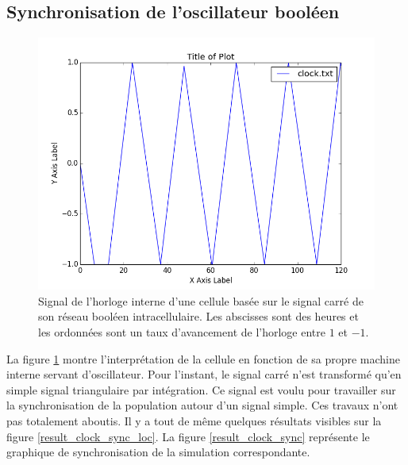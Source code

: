 \documentclass[11pt, a4paper]{article}
\begin{document}
\subsection{Synchronisation de l'oscillateur booléen}
\begin{figure}[position]
    \begin{center}
        \includegraphics[scale=0.4]{clock}
        \caption{
            \label{result_clock}
            Signal de l'horloge interne d'une cellule basée sur le signal carré
            de son réseau booléen intracellulaire. Les abscisses sont des
            heures et les ordonnées sont un taux d'avancement de l'horloge
            entre $1$ et $-1$.
        }
    \end{center}
\end{figure}

La figure \ref{result_clock} montre l'interprétation de la cellule en fonction
de sa propre machine interne servant d'oscillateur. Pour l'instant, le signal
carré n'est transformé qu'en simple signal triangulaire par intégration. Ce
signal est voulu pour travailler sur la synchronisation de la population autour
d'un signal simple. Ces travaux n'ont pas totalement aboutis. Il y a tout de
même quelques résultats visibles sur la figure \ref{result_clock_sync_loc}. La
figure \ref{result_clock_sync} représente le graphique de synchronisation de la
simulation correspondante.
\end{document}

